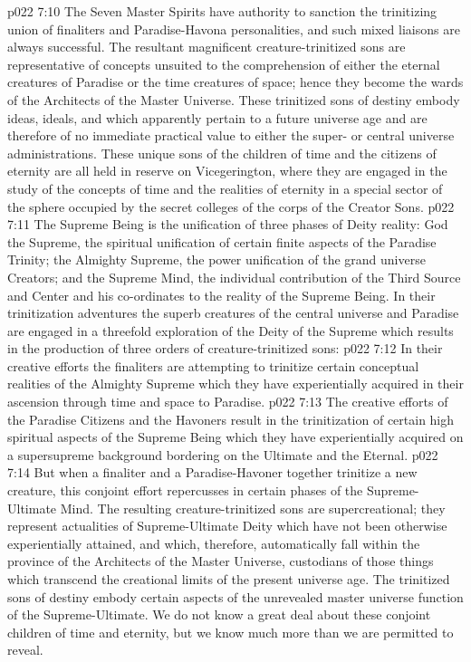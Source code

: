 \pc \vs p022 7:10 The Seven Master Spirits have authority to sanction the trinitizing union of finaliters and Paradise\hyp{}Havona personalities, and such mixed liaisons are always successful. The resultant magnificent creature\hyp{}trinitized sons are representative of concepts unsuited to the comprehension of either the eternal creatures of Paradise or the time creatures of space; hence they become the wards of the Architects of the Master Universe. These trinitized sons of destiny embody ideas, ideals, and  which apparently pertain to a future universe age and are therefore of no immediate practical value to either the super\hyp{} or central universe administrations. These unique sons of the children of time and the citizens of eternity are all held in reserve on Vicegerington, where they are engaged in the study of the concepts of time and the realities of eternity in a special sector of the sphere occupied by the secret colleges of the corps of the Creator Sons.
\pc \vs p022 7:11 The Supreme Being is the unification of three phases of Deity reality: God the Supreme, the spiritual unification of certain finite aspects of the Paradise Trinity; the Almighty Supreme, the power unification of the grand universe Creators; and the Supreme Mind, the individual contribution of the Third Source and Center and his co\hyp{}ordinates to the reality of the Supreme Being. In their trinitization adventures the superb creatures of the central universe and Paradise are engaged in a threefold exploration of the Deity of the Supreme which results in the production of three orders of creature\hyp{}trinitized sons:
\pc \vs p022 7:12 \bibnobreakspace {} In their creative efforts the finaliters are attempting to trinitize certain conceptual realities of the Almighty Supreme which they have experientially acquired in their ascension through time and space to Paradise.
\pc \vs p022 7:13 \bibnobreakspace {} The creative efforts of the Paradise Citizens and the Havoners result in the trinitization of certain high spiritual aspects of the Supreme Being which they have experientially acquired on a supersupreme background bordering on the Ultimate and the Eternal.
\pc \vs p022 7:14 \bibnobreakspace {} But when a finaliter and a Paradise\hyp{}Havoner together trinitize a new creature, this conjoint effort repercusses in certain phases of the Supreme\hyp{}Ultimate Mind. The resulting creature\hyp{}trinitized sons are supercreational; they represent actualities of Supreme\hyp{}Ultimate Deity which have not been otherwise experientially attained, and which, therefore, automatically fall within the province of the Architects of the Master Universe, custodians of those things which transcend the creational limits of the present universe age. The trinitized sons of destiny embody certain aspects of the unrevealed master universe function of the Supreme\hyp{}Ultimate. We do not know a great deal about these conjoint children of time and eternity, but we know much more than we are permitted to reveal.
